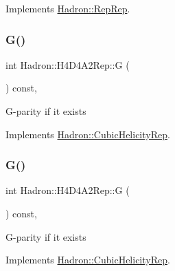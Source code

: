Implements \mbox{\hyperlink{structHadron_1_1RepRep_a92c8802e5ed7afd7da43ccfd5b7cd92b}{Hadron\+::\+Rep\+Rep}}.

\mbox{\label{structHadron_1_1H4D4A2Rep_add691ecf1c27769c705c534dcf292602}} 
\subsubsection{\texorpdfstring{G()}{G()}\hspace{0.1cm}{\footnotesize\ttfamily [1/3]}}
{\footnotesize\ttfamily int Hadron\+::\+H4\+D4\+A2\+Rep\+::G (\begin{DoxyParamCaption}{ }\end{DoxyParamCaption}) const\hspace{0.3cm}{\ttfamily [inline]}, {\ttfamily [virtual]}}

G-\/parity if it exists 

Implements \mbox{\hyperlink{structHadron_1_1CubicHelicityRep_a50689f42be1e6170aa8cf6ad0597018b}{Hadron\+::\+Cubic\+Helicity\+Rep}}.

\mbox{\label{structHadron_1_1H4D4A2Rep_add691ecf1c27769c705c534dcf292602}} 
\subsubsection{\texorpdfstring{G()}{G()}\hspace{0.1cm}{\footnotesize\ttfamily [2/3]}}
{\footnotesize\ttfamily int Hadron\+::\+H4\+D4\+A2\+Rep\+::G (\begin{DoxyParamCaption}{ }\end{DoxyParamCaption}) const\hspace{0.3cm}{\ttfamily [inline]}, {\ttfamily [virtual]}}

G-\/parity if it exists 

Implements \mbox{\hyperlink{structHadron_1_1CubicHelicityRep_a50689f42be1e6170aa8cf6ad0597018b}{Hadron\+::\+Cubic\+Helicity\+Rep}}.

\mbox{\label{structHadron_1_1H4D4A2Rep_add691ecf1c27769c705c534dcf292602}} 
